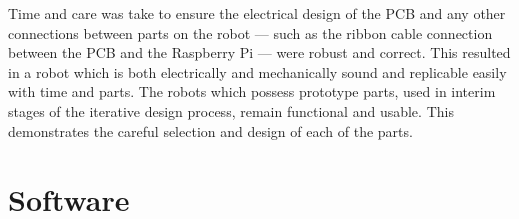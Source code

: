 Time and care was take to ensure the electrical design of the PCB and any other 
connections between parts on the robot --- such as the ribbon cable connection 
between the PCB and the Raspberry Pi --- were robust and correct. This resulted 
in a robot which is both electrically and mechanically sound and replicable 
easily with time and parts. The robots which possess prototype parts, used in 
interim stages of the iterative design process, remain functional and usable. 
This demonstrates the careful selection and design of each of the parts. 


\section{Software}\label{eval/soft}
